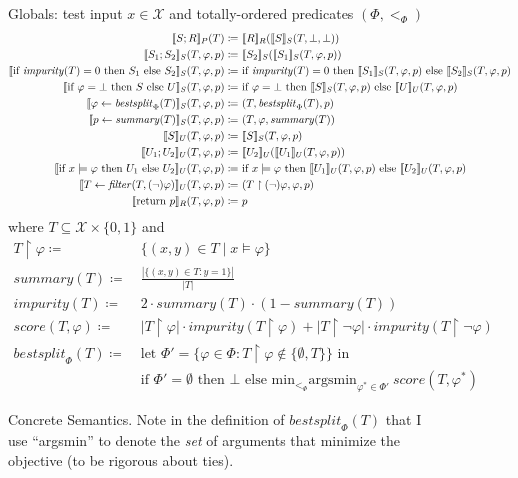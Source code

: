\begin{figure}
\centering
Globals: test input $x \in \mathcal{X}$ and totally-ordered predicates $(\Phi, <_\Phi)$
\begin{align*}
\den[P]{S ; R}(T) \coloneqq&~
\den[R]{R}(\den[S]{S}(T, \bot, \bot)) \\
%
\den[S]{S_1 ; S_2}(T, \varphi, p) \coloneqq&~
\den[S]{S_2}(\den[S]{S_1}(T, \varphi, p)) \\
%
\den[S]{\iteimpuritynode{S_1}{S_2}}(T, \varphi, p) \coloneqq&~
\text{if } \mathit{impurity}(T) = 0 \text{ then } \den[S]{S_1}(T, \varphi, p)
\text{ else } \den[S]{S_2}(T, \varphi, p) \\
%
\den[S]{\itetrivialnode{S}{U}}(T, \varphi, p) \coloneqq&~
\text{if } \varphi = \bot \text{ then } \den[S]{S}(T, \varphi, p)
\text{ else } \den[U]{U}(T, \varphi, p) \\
%
\den[S]{\bestsplitnode}(T, \varphi, p) \coloneqq&~
(T, \mathit{bestsplit}_\Phi(T), p) \\
%
\den[S]{\summarynode}(T, \varphi, p) \coloneqq&~
(T, \varphi, \mathit{summary}(T)) \\
%
\den[U]{S}(T, \varphi, p) \coloneqq&~
\den[S]{S}(T, \varphi, p) \\
%
\den[U]{U_1 ; U_2}(T, \varphi, p) \coloneqq&~
\den[U]{U_2}(\den[U]{U_1}(T, \varphi, p)) \\
%
\den[U]{\itemodelsnode{U_1}{U_2}}(T, \varphi, p) \coloneqq&~
\text{if } x \models \varphi \text{ then } \den[U]{U_1}(T, \varphi, p)
\text{ else } \den[U]{U_2}(T, \varphi, p) \\
%
\den[U]{\filternode[(\lnot)]}(T, \varphi, p) \coloneqq&~
(T \upharpoonright (\lnot)\varphi, \varphi, p) \\
%
\den[R]{\returnnode}(T, \varphi, p) \coloneqq&~ p
\end{align*}
where $T \subseteq \mathcal{X} \times \{0,1\}$ and
\begin{align*}
T \upharpoonright \varphi \coloneqq&~ \{(x,y) \in T \mid x \models \varphi\} \\
\mathit{summary}(T) \coloneqq&~ \frac{|\{(x,y) \in T : y = 1\}|}{|T|} \\
\mathit{impurity}(T) \coloneqq&~ 2 \cdot \mathit{summary}(T) \cdot (1-\mathit{summary}(T)) \\
\mathit{score}(T, \varphi) \coloneqq&~
|T \upharpoonright \varphi| \cdot \mathit{impurity}(T \upharpoonright \varphi) +
|T \upharpoonright \lnot\varphi| \cdot \mathit{impurity}(T \upharpoonright \lnot\varphi) \\
\mathit{bestsplit}_\Phi(T) \coloneqq&~
\text{let } \Phi' = \{\varphi \in \Phi : T \upharpoonright \varphi \not\in \{\emptyset, T\}\} \text{ in } \\
&~\text{if } \Phi' = \emptyset \text{ then } \bot \text{ else }
\text{min}_{<_\Phi} \text{argsmin}_{\varphi^* \in \Phi'}~\mathit{score}(T, \varphi^*)
\end{align*}
\caption{Concrete Semantics.
Note in the definition of $\mathit{bestsplit}_\Phi(T)$
that I use ``argsmin'' to denote the \emph{set} of arguments
that minimize the objective (to be rigorous about ties).}
\label{fig:concrete}
\end{figure}
